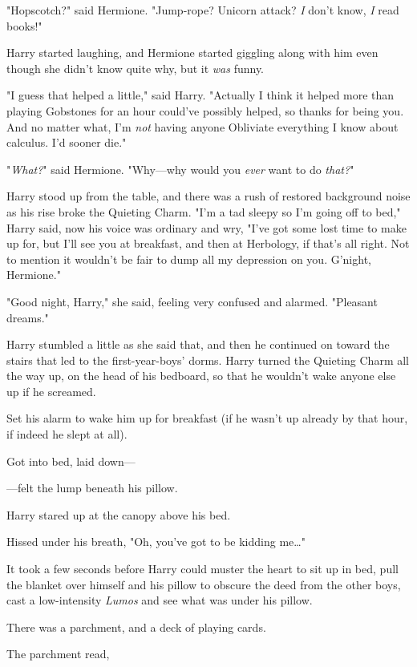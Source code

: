 "Hopscotch?" said Hermione. "Jump-rope? Unicorn attack? \emph{I} don't know,
\emph{I} read books!"

Harry started laughing, and Hermione started giggling along with him even
though she didn't know quite why, but it \emph{was} funny.

"I guess that helped a little," said Harry. "Actually I think it helped more
than playing Gobstones for an hour could've possibly helped, so thanks for
being you. And no matter what, I'm \emph{not} having anyone Obliviate
everything I know about calculus. I'd sooner die."

"\emph{What?}" said Hermione. "Why—why would you \emph{ever} want to do
\emph{that?}"

Harry stood up from the table, and there was a rush of restored background
noise as his rise broke the Quieting Charm. "I'm a tad sleepy so I'm going off
to bed," Harry said, now his voice was ordinary and wry, "I've got some lost
time to make up for, but I'll see you at breakfast, and then at Herbology, if
that's all right. Not to mention it wouldn't be fair to dump all my depression
on you. G'night, Hermione."

"Good night, Harry," she said, feeling very confused and alarmed. "Pleasant
dreams."

Harry stumbled a little as she said that, and then he continued on toward the
stairs that led to the first-year-boys' dorms.
\later
Harry turned the Quieting Charm all the way up, on the head of his bedboard, so
that he wouldn't wake anyone else up if he screamed.

Set his alarm to wake him up for breakfast (if he wasn't up already by that
hour, if indeed he slept at all).

Got into bed, laid down—

—felt the lump beneath his pillow.

Harry stared up at the canopy above his bed.

Hissed under his breath, "Oh, you've got to be kidding me…"

It took a few seconds before Harry could muster the heart to sit up in bed,
pull the blanket over himself and his pillow to obscure the deed from the other
boys, cast a low-intensity \emph{Lumos} and see what was under his pillow.

There was a parchment, and a deck of playing cards.

The parchment read,

